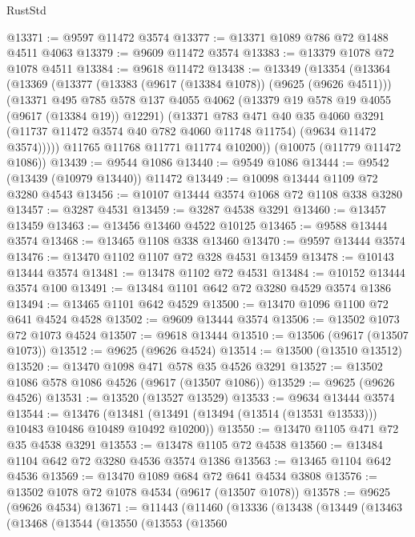 \begin{lexlean}{RustStd}
\begin{coremodule}
{\begin{coremodule}
{{{{{{{{{{{{{{{{{{{{{{{{{{{{{{{{{@13371 := @9597 @11472 @3574
@13377 := @13371 @1089 @786 @72 @1488 @4511 @4063
@13379 := @9609 @11472 @3574
@13383 := @13379 @1078 @72 @1078 @4511
@13384 := @9618 @11472
@13438 := @13349
    (@13354
      (@13364
        (@13369
          (@13377
            (@13383 (@9617 (@13384 @1078)) (@9625 (@9626 @4511)))
            (@13371
              @495
              @785
              @578
              @137
              @4055
              @4062
              (@13379 @19 @578 @19 @4055 (@9617 (@13384 @19)) @12291)
              (@13371
                @783
                @471
                @40
                @35
                @4060
                @3291
                (@11737 @11472 @3574 @40 @782 @4060 @11748 @11754)
                (@9634 @11472 @3574)))))
        @11765
        @11768
        @11771
        @11774
        @10200))
    (@10075 (@11779 @11472 @1086))
@13439 := @9544 @1086
@13440 := @9549 @1086
@13444 := @9542 (@13439 (@10979 @13440)) @11472
@13449 := @10098 @13444 @1109 @72 @3280 @4543
@13456 := @10107 @13444 @3574 @1068 @72 @1108 @338 @3280
@13457 := @3287 @4531
@13459 := @3287 @4538 @3291
@13460 := @13457 @13459
@13463 := @13456 @13460 @4522 @10125
@13465 := @9588 @13444 @3574
@13468 := @13465 @1108 @338 @13460
@13470 := @9597 @13444 @3574
@13476 := @13470 @1102 @1107 @72 @328 @4531 @13459
@13478 := @10143 @13444 @3574
@13481 := @13478 @1102 @72 @4531
@13484 := @10152 @13444 @3574 @100
@13491 := @13484 @1101 @642 @72 @3280 @4529 @3574 @1386
@13494 := @13465 @1101 @642 @4529
@13500 := @13470 @1096 @1100 @72 @641 @4524 @4528
@13502 := @9609 @13444 @3574
@13506 := @13502 @1073 @72 @1073 @4524
@13507 := @9618 @13444
@13510 := @13506 (@9617 (@13507 @1073))
@13512 := @9625 (@9626 @4524)
@13514 := @13500 (@13510 @13512)
@13520 := @13470 @1098 @471 @578 @35 @4526 @3291
@13527 := @13502 @1086 @578 @1086 @4526 (@9617 (@13507 @1086))
@13529 := @9625 (@9626 @4526)
@13531 := @13520 (@13527 @13529)
@13533 := @9634 @13444 @3574
@13544 := @13476
    (@13481 (@13491 (@13494 (@13514 (@13531 @13533))) @10483 @10486 @10489 @10492 @10200))
@13550 := @13470 @1105 @471 @72 @35 @4538 @3291
@13553 := @13478 @1105 @72 @4538
@13560 := @13484 @1104 @642 @72 @3280 @4536 @3574 @1386
@13563 := @13465 @1104 @642 @4536
@13569 := @13470 @1089 @684 @72 @641 @4534 @3808
@13576 := @13502 @1078 @72 @1078 @4534 (@9617 (@13507 @1078))
@13578 := @9625 (@9626 @4534)
@13671 := @11443
    (@11460
      (@13336
        (@13438
          (@13449
            (@13463
              (@13468
                (@13544
                  (@13550
                    (@13553
                      (@13560
}}}}}}}}}}}}}}}}}}}}}}}}}}}}}}}}}
\end{coremodule}}
\end{coremodule}
\end{lexlean}

